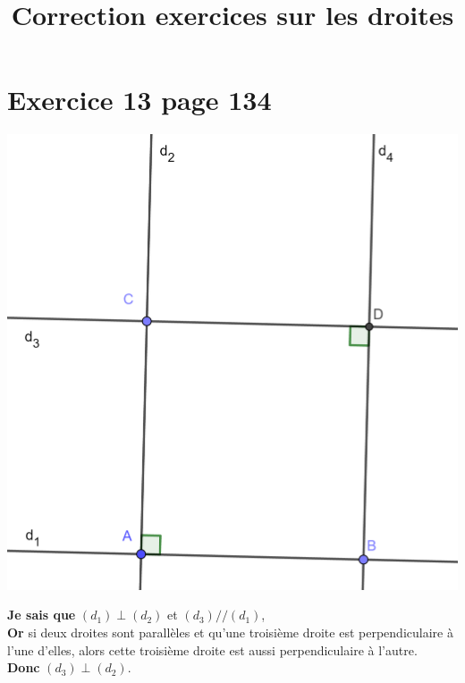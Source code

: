\documentclass[12pt,a4paper]{article}
\date{}
\title{Correction exercices sur les droites}
\begin{document}
	
\maketitle

\vspace*{-3cm}
%
%


%

\section*{Exercice 13 page 134}


\begin{center}
	\includegraphics[scale=0.15]{ex13_p134}
\end{center}


\noindent \textbf{Je sais que} $(d_1) \perp (d_2)$ et $(d_3) // (d_1)$,\\
\textbf{Or} si deux droites sont parallèles et qu'une troisième droite est perpendiculaire à l'une d'elles, alors cette troisième droite est aussi perpendiculaire à l'autre.\\
\textbf{Donc} $(d_3) \perp (d_2)$.\\
\end{document}

